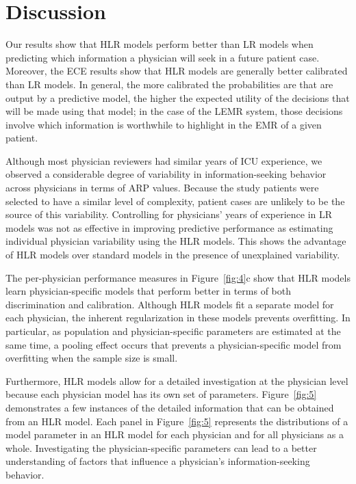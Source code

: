 \section{Discussion}\label{sec:discussion}
Our results show that HLR models perform better than LR models when predicting which information a physician will seek in a future patient case. Moreover, the ECE results show that HLR models are generally better calibrated than LR models. In general, the more calibrated the probabilities are that are output by a predictive model, the higher the expected utility of the decisions that will be made using that model; in the case of the LEMR system, those decisions involve which information is worthwhile to highlight in the EMR of a given patient.

Although most physician reviewers had similar years of ICU experience, we observed a considerable degree of variability in information-seeking behavior across physicians in terms of ARP values. Because the study patients were selected to have a similar level of complexity, patient cases are unlikely to be the source of this variability. Controlling for physicians’ years of experience in LR models was not as effective in improving predictive performance as estimating individual physician variability using the HLR models. This shows the advantage of HLR models over standard models in the presence of unexplained variability.

The per-physician performance measures in Figure~\ref{fig:4}c show that HLR models learn physician-specific models that perform better in terms of both discrimination and calibration. Although HLR models fit a separate model for each physician, the inherent regularization in these models prevents overfitting. In particular, as population and physician-specific parameters are estimated at the same time, a pooling effect occurs that prevents a physician-specific model from overfitting when the sample size is small.

Furthermore, HLR models allow for a detailed investigation at the physician level because each physician model has its own set of parameters. Figure~\ref{fig:5} demonstrates a few instances of the detailed information that can be obtained from an HLR model. Each panel in Figure~\ref{fig:5} represents the distributions of a model parameter in an HLR model for each physician and for all physicians as a whole. Investigating the physician-specific parameters can lead to a better understanding of factors that influence a physician’s information-seeking behavior.

